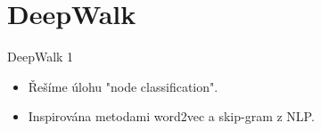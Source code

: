 \documentclass[10pt]{beamer}
\begin{document}
\section{DeepWalk}

\begin{frame}{DeepWalk 1}
	\begin{itemize}
		\item Řešíme úlohu "node classification".
		\item Inspirována metodami word2vec a skip-gram z NLP.
	\end{itemize}
\end{frame}


















\end{document}
